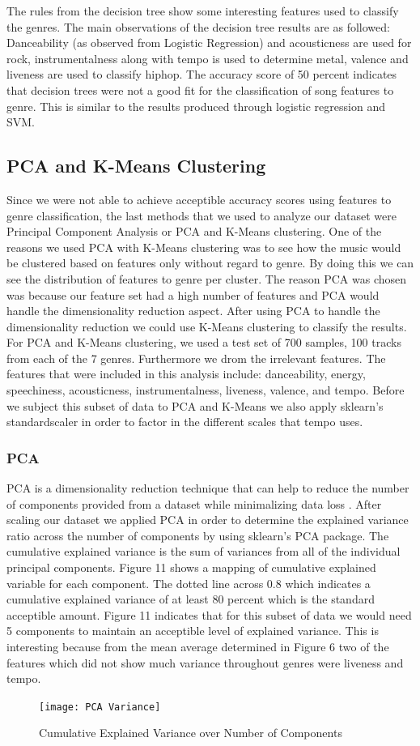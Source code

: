 \documentclass[11pt, a4paper, twocolumn]{article}
\begin{document}
The rules from the decision tree show some interesting features used to classify the genres. The main observations of the decision tree results are as followed: Danceability (as observed from Logistic Regression) and acousticness are used for rock, instrumentalness along with tempo is used to determine metal, valence and liveness are used to classify hiphop. The accuracy score of 50 percent indicates that decision trees were not a good fit for the classification of song features to genre. This is similar to the results produced through logistic regression and SVM. 

\subsection{PCA and K-Means Clustering}
Since we were not able to achieve acceptible accuracy scores using features to genre classification, the last methods that we used to analyze our dataset were Principal Component Analysis or PCA and K-Means clustering. One of the reasons we used PCA with K-Means clustering was to see how the music would be clustered based on features only without regard to genre. By doing this we can see the distribution of features to genre per cluster. The reason PCA was chosen was because our feature set had a high number of features and PCA would handle the dimensionality reduction aspect. After using PCA to handle the dimensionality reduction we could use K-Means clustering to classify the results. 
For PCA and K-Means clustering, we used a test set of 700 samples, 100 tracks from each of the 7 genres. Furthermore we drom the irrelevant features. The features that were included in this analysis include: danceability, energy, speechiness, acousticness, instrumentalness, liveness, valence, and tempo. Before we subject this subset of data to PCA and K-Means we also apply sklearn's standardscaler in order to factor in the different scales that tempo uses. 
\subsubsection{PCA}
PCA is a dimensionality reduction technique that can help to reduce the number of components provided from a dataset while minimalizing data loss \cite{pca}. After scaling our dataset we applied PCA in order to determine the explained variance ratio across the number of components by using sklearn's PCA package. The cumulative explained variance is the sum of variances from all of the individual principal components\cite{cev}. Figure 11 shows a mapping of cumulative explained variable for each component. The dotted line across 0.8 which indicates a cumulative explained variance of at least 80 percent which is the standard acceptible amount. Figure 11 indicates that for this subset of data we would need 5 components to maintain an acceptible level of explained variance. This is interesting because from the mean average determined in Figure 6 two of the features which did not show much variance throughout genres were liveness and tempo. 
\begin{figure}[htb!]
\centerline{\texttt{[image: PCA Variance]}}
\caption{Cumulative Explained Variance over Number of Components}
\end{figure} 
\end{document}
